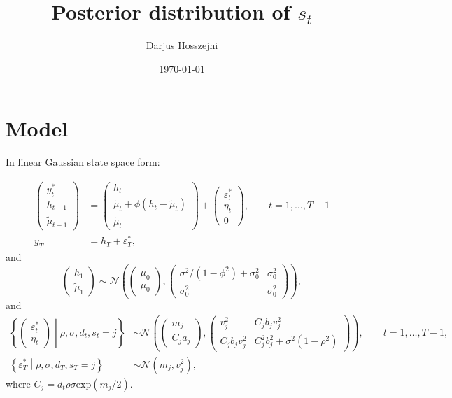 \documentclass{article}
\title{Posterior distribution of $s_t$}
\author{Darjus Hosszejni}
\date{\today}
\begin{document}
\maketitle

\section{Model}

In linear Gaussian state space form:

\begin{align*}
\begin{pmatrix}
y^*_t \\
h_{t+1} \\
\tilde\mu_{t+1}
\end{pmatrix} &=
\begin{pmatrix}
h_t \\
\tilde\mu_t+\phi(h_t-\tilde\mu_t) \\
\tilde\mu_t
\end{pmatrix} +
\begin{pmatrix}
\varepsilon^*_t \\
\eta_t \\
0
\end{pmatrix}, \qquad t=1,\dots,T-1 \\
y_T &= h_T + \varepsilon^*_T,
\end{align*}
and
\begin{equation*}
\begin{pmatrix}
h_1 \\
\tilde\mu_1
\end{pmatrix} \sim
\mathcal{N}\left(
\begin{pmatrix}
\mu_0 \\
\mu_0
\end{pmatrix},
\begin{pmatrix}
\sigma^2/(1-\phi^2)+\sigma_0^2 & \sigma_0^2 \\
\sigma_0^2 & \sigma_0^2
\end{pmatrix}
\right),
\end{equation*}
and
\begin{align*}
\left\{
\begin{pmatrix}
\varepsilon^*_t \\
\eta_t
\end{pmatrix}\middle\vert\rho,\sigma,d_t,s_t=j
\right\}
& \sim 
\mathcal{N}\left(
\begin{pmatrix}
m_j \\
C_j a_j
\end{pmatrix},
\begin{pmatrix}
v_j^2 & C_j b_j v_j^2 \\
C_j b_j v_j^2 & C_j^2b_j^2 + \sigma^2(1-\rho^2)
\end{pmatrix}
\right),\qquad t=1,\dots,T-1, \\
\left\{\varepsilon^*_T \middle\vert\rho,\sigma,d_T,s_T=j\right\}
& \sim 
\mathcal{N}\left(m_j, v_j^2\right),
\end{align*}
where $C_j = d_t\rho\sigma\text{exp}(m_j/2)$.
\end{document}

